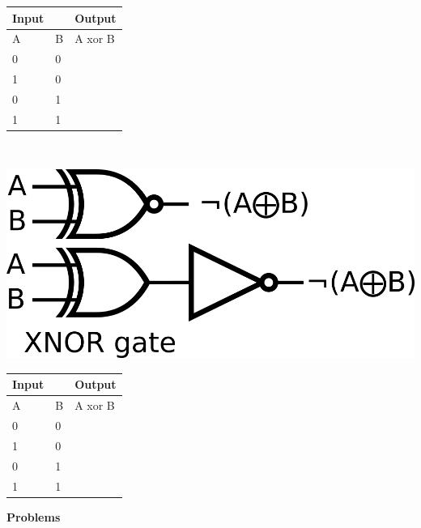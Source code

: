 \begin{minipage}{\linewidth}
    \begin{tabular}{|ll|l|}
        \hline
        Input                   &   & Output  \\ \hline
        \multicolumn{1}{|l|}{A} & B & A xor B \\ \hline
        \multicolumn{1}{|l|}{0} & 0 &        \\ \hline
        \multicolumn{1}{|l|}{1} & 0 &       \\ \hline
        \multicolumn{1}{|l|}{0} & 1 &        \\ \hline
        \multicolumn{1}{|l|}{1} & 1 &        \\ \hline
    \end{tabular}
\end{minipage}\\
\vspace{30mm}
\hspace{1in}
\begin{minipage}{.5\linewidth}
    \includegraphics[width=3 in]{images/xnor_diagram.png}
	\label{img2}
\end{minipage}
\begin{minipage}{\linewidth}
    \begin{tabular}{|ll|l|}
        \hline
        Input                   &   & Output  \\ \hline
        \multicolumn{1}{|l|}{A} & B & A xor B \\ \hline
        \multicolumn{1}{|l|}{0} & 0 &        \\ \hline
        \multicolumn{1}{|l|}{1} & 0 &       \\ \hline
        \multicolumn{1}{|l|}{0} & 1 &        \\ \hline
        \multicolumn{1}{|l|}{1} & 1 &        \\ \hline
    \end{tabular}
\end{minipage}
\begin{center}
    \textbf{Problems}
\end{center}
